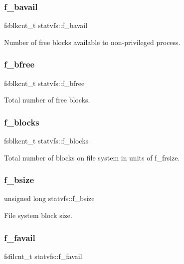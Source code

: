 \subsubsection{\texorpdfstring{f\_bavail}{f\_bavail}}
{\footnotesize\ttfamily fsblkcnt\+\_\+t statvfs\+::f\+\_\+bavail}

Number of free blocks available to non-\/privileged process. \mbox{\label{structstatvfs_ab004873a74b951610b969a222116dccb}} 
\subsubsection{\texorpdfstring{f\_bfree}{f\_bfree}}
{\footnotesize\ttfamily fsblkcnt\+\_\+t statvfs\+::f\+\_\+bfree}

Total number of free blocks. \mbox{\label{structstatvfs_a83b2d1725a43fef463597eda75b7af1b}} 
\subsubsection{\texorpdfstring{f\_blocks}{f\_blocks}}
{\footnotesize\ttfamily fsblkcnt\+\_\+t statvfs\+::f\+\_\+blocks}

Total number of blocks on file system in units of f\+\_\+frsize. \mbox{\label{structstatvfs_a3400d89a2627d6313da0cb39ff6209ec}} 
\subsubsection{\texorpdfstring{f\_bsize}{f\_bsize}}
{\footnotesize\ttfamily unsigned long statvfs\+::f\+\_\+bsize}

File system block size. \mbox{\label{structstatvfs_a6f336f60b6cba33b9380181ef413022f}} 
\subsubsection{\texorpdfstring{f\_favail}{f\_favail}}
{\footnotesize\ttfamily fsfilcnt\+\_\+t statvfs\+::f\+\_\+favail}

